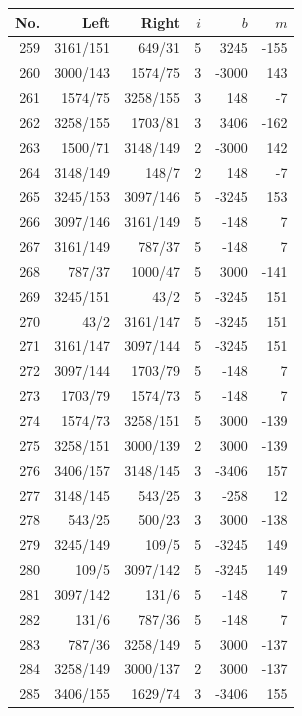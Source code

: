 \documentclass[11pt,a4paper]{article}
\begin{document}
\noindent\begin{minipage}[t]{.49\linewidth}\centering\footnotesize\setlength{\tabcolsep}{2pt}\renewcommand{\arraystretch}{1.09}
\begin{tabular*}{\linewidth}{@{}r@{\extracolsep{\fill}}rrrrr@{}}\toprule
No. & Left & Right & $i$ & $b$ & $m$\\\midrule
259 & 3161/151 & 649/31 & 5 & 3245 & -155\\
260 & 3000/143 & 1574/75 & 3 & -3000 & 143\\
261 & 1574/75 & 3258/155 & 3 & 148 & -7\\
262 & 3258/155 & 1703/81 & 3 & 3406 & -162\\
263 & 1500/71 & 3148/149 & 2 & -3000 & 142\\
264 & 3148/149 & 148/7 & 2 & 148 & -7\\
265 & 3245/153 & 3097/146 & 5 & -3245 & 153\\
266 & 3097/146 & 3161/149 & 5 & -148 & 7\\
267 & 3161/149 & 787/37 & 5 & -148 & 7\\
268 & 787/37 & 1000/47 & 5 & 3000 & -141\\
269 & 3245/151 & 43/2 & 5 & -3245 & 151\\
270 & 43/2 & 3161/147 & 5 & -3245 & 151\\
271 & 3161/147 & 3097/144 & 5 & -3245 & 151\\
272 & 3097/144 & 1703/79 & 5 & -148 & 7\\
273 & 1703/79 & 1574/73 & 5 & -148 & 7\\
274 & 1574/73 & 3258/151 & 5 & 3000 & -139\\
275 & 3258/151 & 3000/139 & 2 & 3000 & -139\\
276 & 3406/157 & 3148/145 & 3 & -3406 & 157\\
277 & 3148/145 & 543/25 & 3 & -258 & 12\\
278 & 543/25 & 500/23 & 3 & 3000 & -138\\
279 & 3245/149 & 109/5 & 5 & -3245 & 149\\
280 & 109/5 & 3097/142 & 5 & -3245 & 149\\
281 & 3097/142 & 131/6 & 5 & -148 & 7\\
282 & 131/6 & 787/36 & 5 & -148 & 7\\
283 & 787/36 & 3258/149 & 5 & 3000 & -137\\
284 & 3258/149 & 3000/137 & 2 & 3000 & -137\\
285 & 3406/155 & 1629/74 & 3 & -3406 & 155\\

\end{tabular*}
\end{minipage}
\end{document}
